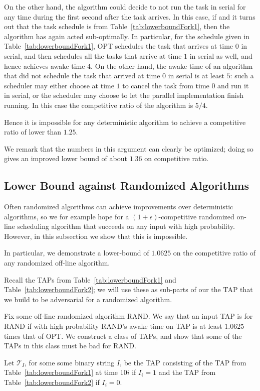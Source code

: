 On the other hand, the algorithm could decide to not run the task
in serial for any time during the first second after the task
arrives. In this case, if
and it turns out that the task schedule is from
Table~\ref{tab:lowerboundFork1}, then the algorithm has again
acted sub-optimally. In particular, for the schedule given in
Table~\ref{tab:lowerboundFork1}, OPT schedules the task that
arrives at time $0$ in serial, and then schedules all the tasks
that arrive at time $1$ in serial as well, and hence achieves
awake time $4$. On the other hand, the awake time of an algorithm
that did not schedule the task that arrived at time $0$ in
serial is at least $5$: such a scheduler may either choose at
time $1$ to cancel the task from time $0$ and run it in serial,
or the scheduler may choose to let the parallel implementation
finish running. In this case the competitive ratio of the
algorithm is $5/4$.

Hence it is impossible for any deterministic algorithm to achieve
a competitive ratio of lower than $1.25$.

We remark that the numbers in this argument can clearly be
optimized; doing so gives an improved lower bound of about $1.36$
on competitive ratio. 

\subsection{Lower Bound against Randomized Algorithms}
Often randomized algorithms can achieve improvements over
deterministic algorithms, so we for example hope for a
$(1+\epsilon)$-competitive randomized on-line scheduling
algorithm that succeeds on any input with high probability.
However, in this subsection we show that this is impossible.

In particular, we demonstrate a lower-bound of $1.0625$ on the
competitive ratio of any randomized off-line algorithm.

Recall the TAPs from Table~\ref{tab:lowerboundFork1} and
Table~\ref{tab:lowerboundFork2}; we will use these as sub-parts
of our the TAP that we build to be adversarial for a randomized
algorithm. 

Fix some off-line randomized algorithm RAND. We say that an input
TAP is  for RAND if with high probability RAND's awake
time on TAP is at least $1.0625$ times that of OPT.
We construct a class of TAPs, and show that some of the TAPs in
this class must be bad for RAND.

Let $\mathcal{T}_{I}$, for some some binary string $I$, be the
TAP consisting of the TAP from Table~\ref{tab:lowerboundFork1} at
time $10i$ if $I_i = 1$ and the TAP from
Table~\ref{tab:lowerboundFork2} if $I_i = 0$. 

